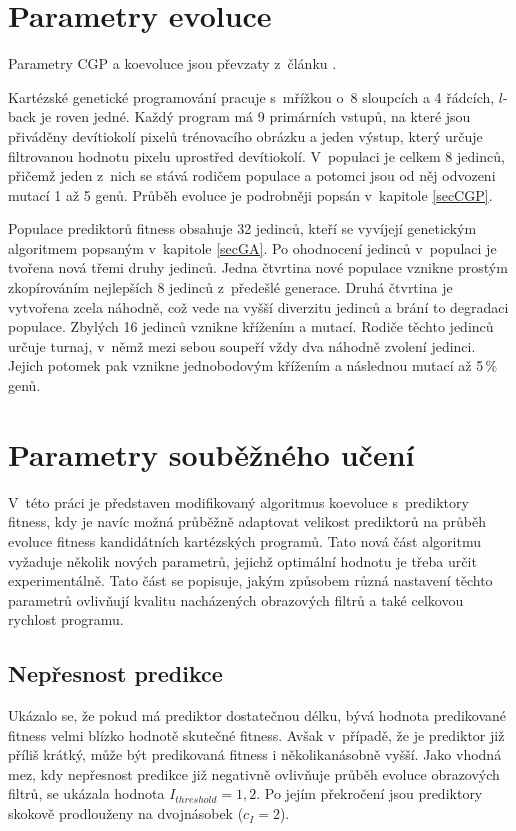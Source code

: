 \section{Parametry evoluce}

Parametry CGP a koevoluce jsou převzaty z~článku \cite{SikuPPSN}.

Kartézské genetické programování pracuje s~mřížkou o~8 sloupcích a 4 řádcích, $l$-back je roven jedné. Každý program má 9 primárních vstupů, na které jsou přiváděny devítiokolí pixelů trénovacího obrázku a jeden výstup, který určuje filtrovanou hodnotu pixelu uprostřed devítiokolí. V~populaci je celkem 8 jedinců, přičemž jeden z~nich se stává rodičem populace a potomci jsou od něj odvozeni mutací 1 až 5 genů. Průběh evoluce je podrobněji popsán v~kapitole \ref{secCGP}.

Populace prediktorů fitness obsahuje 32 jedinců, kteří se vyvíjejí genetickým algoritmem popsaným v~kapitole \ref{secGA}. Po ohodnocení jedinců v~populaci je tvořena nová třemi druhy jedinců. Jedna čtvrtina nové populace vznikne prostým zkopírováním nejlepších 8 jedinců z~předešlé generace. Druhá čtvrtina je vytvořena zcela náhodně, což vede na vyšší diverzitu jedinců a brání to degradaci populace. Zbylých 16 jedinců vznikne křížením a mutací. Rodiče těchto jedinců určuje turnaj, v~němž mezi sebou soupeří vždy dva náhodně zvolení jedinci. Jejich potomek pak vznikne jednobodovým křížením a následnou mutací až 5\,\% genů.

\section{Parametry souběžného učení}

V~této práci je představen modifikovaný algoritmus koevoluce s~prediktory fitness, kdy je navíc možná průběžně adaptovat velikost prediktorů na průběh evoluce fitness kandidátních kartézských programů. Tato nová část algoritmu vyžaduje několik nových parametrů, jejichž optimální hodnotu je třeba určit experimentálně. Tato část se popisuje, jakým způsobem různá nastavení těchto parametrů ovlivňují kvalitu nacházených obrazových filtrů a také celkovou rychlost programu.

\subsection{Nepřesnost predikce}

Ukázalo se, že pokud má prediktor dostatečnou délku, bývá hodnota predikované fitness velmi blízko hodnotě skutečné fitness. Avšak v~případě, že je prediktor již příliš krátký, může být predikovaná fitness i několikanásobně vyšší. Jako vhodná mez, kdy nepřesnost predikce již negativně ovlivňuje průběh evoluce obrazových filtrů, se ukázala hodnota $I_\mathit{threshold} = 1,2$. Po jejím překročení jsou prediktory skokově prodlouženy na dvojnásobek ($c_I = 2$).

